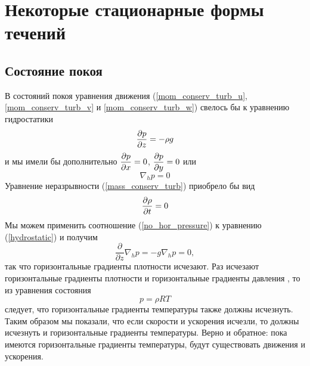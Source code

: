 \section{{\color{done}Некоторые стационарные формы течений}}

\subsection{{\color{done}Состояние покоя}}
    В состояний покоя уравнения движения (\ref{mom_conserv_turb_u}, \ref{mom_conserv_turb_v} и \ref{mom_conserv_turb_w}) свелось бы к уравнению гидростатики
    \begin{equation}
    \label{hydrostatic}
        \displaystyle\frac{\partial p}{\partial z} = -\rho g
    \end{equation}
    и мы имели бы дополнительно $\displaystyle\frac{\partial p}{\partial x}=0$, $\displaystyle\frac{\partial p}{\partial y}=0$ или 
    \begin{equation}
    \nabla_h p=0    
    \end{equation}
    Уравнение неразрывности (\ref{mass_conserv_turb}) приобрело бы вид 
    \begin{equation}
    \label{no_hor_pressure}
        \displaystyle\frac{\partial \rho}{\partial t} = 0
    \end{equation}
    Мы можем применить соотношение (\ref{no_hor_pressure}) к уравнению (\ref{hydrostatic}) и получим
    \begin{equation}
        \frac{\partial}{\partial z}\nabla_h p = -g \nabla_h p = 0,
    \end{equation}
    так что горизонтальные градиенты плотности исчезают. Раз исчезают горизонтальные градиенты плотности и горизонтальные градиенты давления , то из уравнения состояния
    \begin{equation}
    \label{state_eq}
        p = \rho R T
    \end{equation}
    следует, что горизонтальные градиенты температуры также должны исчезнуть. Таким образом мы показали, что если скорости и ускорения исчезли, то должны исчезнуть и горизонтальные градиенты температуры. Верно и обратное: пока имеются горизонтальные градиенты температуры, будут существовать движения и ускорения.

